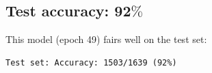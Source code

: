 \documentclass[twocolumn,9pt]{article}
\begin{document}
\subsection*{Test accuracy: 92$\%$}
This model (epoch 49) fairs well on the test set:
\begin{lstlisting}
Test set: Accuracy: 1503/1639 (92%)
\end{lstlisting}
\end{document}
